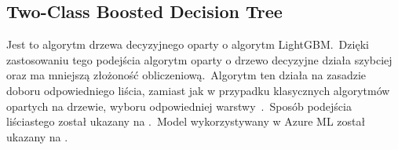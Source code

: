 \vfill
\pagebreak

\subsection{Two-Class Boosted Decision Tree}
Jest to algorytm drzewa decyzyjnego oparty o algorytm LightGBM.\ Dzięki zastosowaniu tego podejścia algorytm oparty o drzewo decyzyjne działa szybciej oraz ma mniejszą złożoność obliczeniową.\ Algorytm ten działa na zasadzie doboru odpowiedniego liścia, zamiast jak w przypadku klasycznych algorytmów opartych na drzewie, wyboru odpowiedniej warstwy~\cite{LightGBM}.\ Sposób podejścia liściastego został ukazany na .\ Model wykorzystywany w Azure ML został ukazany na .
\begin{figure}[H]
    \begin{subfigure}[m]{0.3\textwidth}
        \centering

\end{subfigure}
\end{figure}
